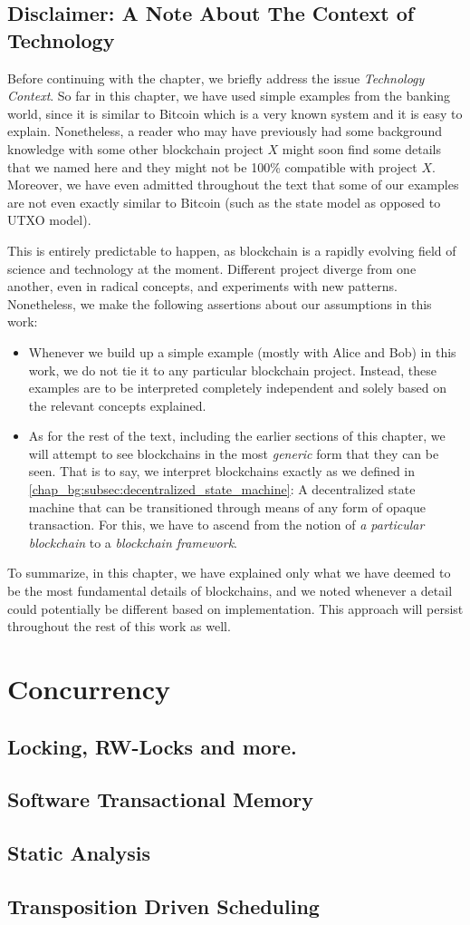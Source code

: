 \subsection{Disclaimer: A Note About The Context of Technology}

Before continuing with the chapter, we briefly address the issue \textit{Technology Context}. So far
in this chapter, we have used simple examples from the banking world, since it is similar to Bitcoin
which is a very known system and it is easy to explain. Nonetheless, a reader who may have
previously had some background knowledge with some other blockchain project $X$ might soon find some
details that we named here and they might not be 100\% compatible with project $X$. Moreover, we
have even admitted throughout the text that some of our examples are not even exactly similar to
Bitcoin (such as the state model as opposed to UTXO model).

This is entirely predictable to happen, as blockchain is a rapidly evolving field of science and
technology at the moment. Different project diverge from one another, even in radical concepts, and
experiments with new patterns. Nonetheless, we make the following assertions about our assumptions
in this work:

\begin{itemize}
	\item Whenever we build up a simple example (mostly with Alice and Bob) in this work, we do not
	tie it to any particular blockchain project. Instead, these examples are to be interpreted
	completely independent and solely based on the relevant concepts explained.
	\item As for the rest of the text, including the earlier sections of this chapter, we will
	attempt to see blockchains in the most \textit{generic} form that they can be seen. That is to
	say, we interpret blockchains exactly as we defined in
	\ref{chap_bg:subsec:decentralized_state_machine}: A decentralized state machine that can be
	transitioned through means of any form of opaque transaction. For this, we have to ascend from
	the notion of \textit{a particular blockchain} to a \textit{blockchain framework}.
\end{itemize}

To summarize, in this chapter, we have explained only what we have deemed to be the most fundamental
details of blockchains, and we noted whenever a detail could potentially be different based on
implementation. This approach will persist throughout the rest of this work as well.


\section{Concurrency} \label{chap_bg:sec:concurrency}

\subsection{Locking, RW-Locks and more.}
\subsection{Software Transactional Memory}
\subsection{Static Analysis}
\subsection{Transposition Driven Scheduling}
